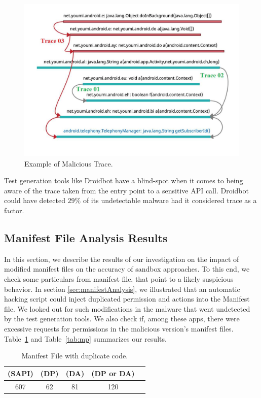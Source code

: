\begin{figure}
\centering
\includegraphics[scale=0.30]{images/maliciousTrace_example01.pdf}
\caption{Example of Malicious Trace.}
 \label{fig:maliciousTrace}
\end{figure}

\begin{obs}{2}{}
 Test generation tools like Droidbot have a blind-spot when it comes to being aware of the trace taken from the entry point to a sensitive API call. Droidbot could have detected $29\%$ of its undetectable malware had it considered trace as a factor.
 \end{obs}

\subsection{Manifest File Analysis Results}\label{sec:manifestResults}

In this section, we describe the results of our investigation on the impact of modified manifest files on the accuracy of sandbox approaches. 
To this end, we check some particulars from manifest file, that point to a likely suspicious behavior. In section \ref{sec:manifestAnalysis}, we illustrated that an automatic hacking script could inject duplicated permission and actions into the Manifest file. We looked out for such modifications in the malware that went undetected by the test generation tools. We also check if, among these apps, there were excessive requests for permissions in the malicious version's manifest files. Table~\ref{tab:mfa} and Table~\ref{tab:mp} summarizes our results. 

\begin{table}[ht]
  \caption{Manifest File with duplicate code.}
  \centering
  \begin{small}
 \begin{tabular}{ccccc}
   \toprule
   (SAPI) & (DP) & (DA) & (DP or DA) \\   \midrule
   607 & 62 & 81 & 120 \\ 
   
 \bottomrule
 \end{tabular}
 \end{small}
 \label{tab:mfa}
\end{table}

